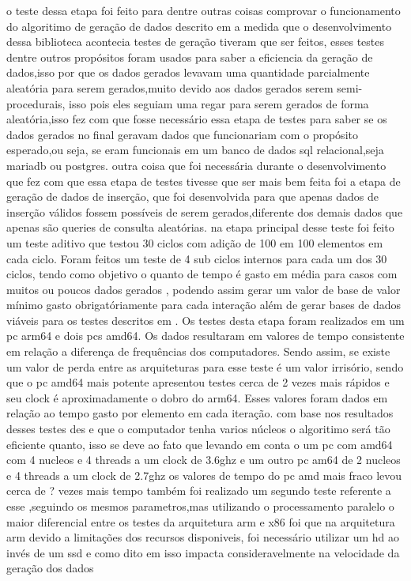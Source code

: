 \documentclass[
	12pt,				%
	openright,			%
	oneside,			%
	a4paper,			%
	english,			%
	french,				%
	spanish,			%
	brazil,				%
	]{abntex2}
\begin{document}
o teste dessa etapa foi feito para dentre outras coisas comprovar o funcionamento do algoritimo de geração de dados descrito em  a medida que o desenvolvimento dessa biblioteca acontecia testes de geração tiveram que ser feitos,
esses testes dentre outros propósitos foram usados para saber a eficiencia da geração de dados,isso por que os dados gerados levavam uma quantidade parcialmente aleatória para serem gerados,muito devido aos dados gerados serem semi-procedurais,
isso pois eles seguiam uma regar para serem gerados de forma aleatória,isso fez com que fosse necessário essa etapa de testes para saber se os dados gerados no final geravam dados que funcionariam com o propósito esperado,ou seja,
se eram funcionais em um banco de dados sql relacional,seja mariadb ou postgres.
outra coisa que foi necessária durante o desenvolvimento que fez com que essa etapa de testes tivesse que ser mais bem feita foi a etapa de geração de dados de inserção,
que foi desenvolvida para que apenas dados de inserção válidos fossem possíveis de serem gerados,diferente dos demais dados que apenas são queries de consulta aleatórias.
na etapa principal desse teste foi feito um teste aditivo que testou 30 ciclos com adição de 100 em 100 elementos em cada ciclo. Foram feitos um teste de 4 sub ciclos internos para cada um dos 30 ciclos,
tendo como objetivo o quanto de tempo é gasto em média para casos com muitos ou poucos dados gerados ,
podendo assim gerar um valor de base de valor mínimo gasto obrigatóriamente para cada interação além de gerar bases de dados viáveis para os testes descritos em .\newline
Os testes desta etapa foram realizados em um pc arm64 e dois pcs amd64. Os dados resultaram em valores de tempo consistente em relação a diferença de frequências dos computadores.
Sendo assim, se existe um valor de perda entre as arquiteturas para esse teste é um valor irrisório,
sendo que o pc amd64 mais potente apresentou testes cerca de 2 vezes mais rápidos e seu clock é aproximadamente o dobro do arm64.
Esses valores foram dados em relação ao tempo gasto por elemento em cada iteração.
com base nos resultados desses testes des e que o computador tenha varios núcleos o algoritimo será tão eficiente quanto,
isso se deve ao fato que levando em conta o um pc com amd64 com 4 nucleos e 4 threads a um clock de 3.6ghz e um outro pc am64 de 2 nucleos e 4 threads a um clock de 2.7ghz os valores de tempo do pc amd mais fraco levou cerca de ? vezes mais tempo
também foi realizado um segundo teste referente a esse ,seguindo os mesmos parametros,mas utilizando o processamento paralelo
o maior diferencial entre os testes da arquitetura arm e x86 foi que na arquitetura arm devido a limitações dos recursos disponiveis,
foi necessário utilizar um hd ao invés de um ssd e como dito em  isso impacta consideravelmente na velocidade da geração dos dados
\end{document}
